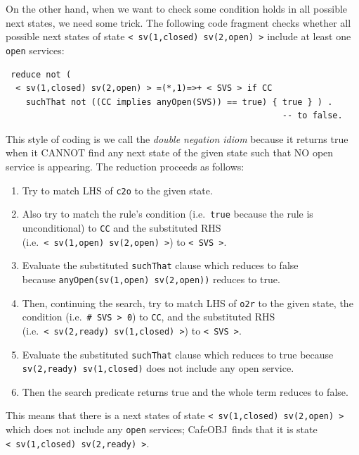 \documentclass[12pt]{report}
\newcommand{\stt}[1]{{\small{\tt {#1}}}}
\newcommand{\cafeobj}{{\sf CafeOBJ}~}
\begin{document}
On the other hand, when we want to check some condition holds in all
possible next states, we need some trick. The following code fragment
checks whether all possible next states of state
\stt{<~sv(1,closed)~sv(2,open)~>} include at least one {\tt open} services:
\begin{verbatim}
 reduce not (
  < sv(1,closed) sv(2,open) > =(*,1)=>+ < SVS > if CC
    suchThat not ((CC implies anyOpen(SVS)) == true) { true } ) .
                                                       -- to false.
\end{verbatim}
This style of coding is we call the {\it double negation idiom}
because it returns true when it CANNOT find any next state of the
given state such that NO open service is appearing. The reduction
proceeds as follows:
\begin{enumerate}
\item Try to match LHS of {\tt c2o} to the given state.
\item Also try to match the rule's condition (i.e.\ {\tt true} because
  the rule is unconditional) to {\tt CC} and the substituted RHS
  (i.e.\ \stt{<~sv(1,open)~sv(2,open)~>}) to \stt{<~SVS~>}.
\item Evaluate the substituted {\tt suchThat} clause which reduces to
  false \\ because \stt{anyOpen(sv(1,open) sv(2,open))} reduces to
  true.
\item Then, continuing the search, try to match LHS of {\tt o2r} to
  the given state, the condition (i.e.\ \stt{\# SVS > 0}) to {\tt CC},
  and the substituted RHS (i.e.\ \stt{<~sv(2,ready)~sv(1,closed)~>}) to
  \stt{<~SVS~>}.
\item Evaluate the substituted {\tt suchThat} clause which reduces to
  true because \stt{sv(2,ready) sv(1,closed)} does not include any
  open service.
\item Then the search predicate returns true and the whole term
  reduces to false.
\end{enumerate}
This means that there is a next states of state
\stt{<~sv(1,closed)~sv(2,open)~>} which does not include any {\tt open}
services; \cafeobj finds that it is state
\stt{<~sv(1,closed)~sv(2,ready)~>}.
\end{document}
